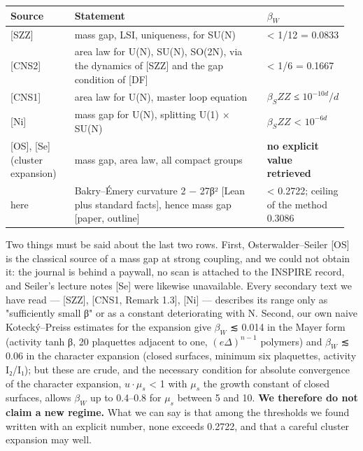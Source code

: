\documentclass[11pt,a4paper]{article}
\theoremstyle{named}
\begin{document}
\begin{center}\begin{small}
\begin{tabular}{>{\raggedright\arraybackslash}p{0.182\linewidth}>{\raggedright\arraybackslash}p{0.547\linewidth}>{\raggedright\arraybackslash}p{0.231\linewidth}}
\hline
\textbf{Source} & \textbf{Statement} & \textbf{$β_W$} \\
\hline
{}[SZZ] & mass gap, LSI, uniqueness, for SU(N) & \textless{} 1/12 = 0.0833 \\
{}[CNS2] & area law for U(N), SU(N), SO(2N), via the dynamics of [SZZ] and the gap condition of [DF] & \textless{} 1/6 = 0.1667 \\
{}[CNS1] & area law for U(N), master loop equation & $β_SZZ$ ≤ $10^{−10d}/d$ \\
{}[Ni] & mass gap for U(N), splitting U(1) × SU(N) & $β_SZZ$ \textless{} $10^{−6d}$ \\
{}[OS], [Se] (cluster expansion) & mass gap, area law, all compact groups & \textbf{no explicit value retrieved} \\
here & Bakry–Émery curvature 2 − 27β² [Lean plus standard facts], hence mass gap [paper, outline] & \textless{} 0.2722; ceiling of the method 0.3086 \\
\hline
\end{tabular}
\end{small}\end{center}
Two things must be said about the last two rows. First, Osterwalder–Seiler [OS] is the classical source of a mass gap at strong coupling, and we could not obtain it: the journal is behind a paywall, no scan is attached to the INSPIRE record, and Seiler's lecture notes [Se] were likewise unavailable. Every secondary text we have read — [SZZ], [CNS1, Remark 1.3], [Ni] — describes its range only as "sufficiently small β" or as a constant deteriorating with N. Second, our own naive Kotecký–Preiss estimates for the expansion give $β_W$ ≲ 0.014 in the Mayer form (activity tanh β, 20 plaquettes adjacent to one, $(eΔ)^{n−1}$ polymers) and $β_W$ ≲ 0.06 in the character expansion (closed surfaces, minimum six plaquettes, activity I₂/I₁); but these are crude, and the necessary condition for absolute convergence of the character expansion, $u·μ_s$ \textless{} 1 with $μ_s$ the growth constant of closed surfaces, allows $β_W$ up to 0.4–0.8 for $μ_s$ between 5 and 10. \textbf{We therefore do not claim a new regime.} What we can say is that among the thresholds we found written with an explicit number, none exceeds 0.2722, and that a careful cluster expansion may well.
\end{document}

